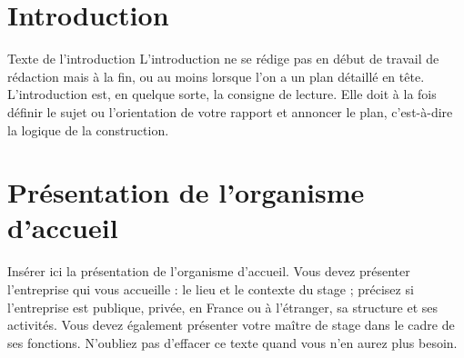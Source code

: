 \chapter*{Introduction}

Texte de l'introduction
L’introduction ne se rédige pas en début de travail de rédaction mais à la fin, ou au moins lorsque l’on a un plan détaillé en tête.
L’introduction est, en quelque sorte, la consigne de lecture. Elle doit à la fois définir le sujet ou l’orientation de votre rapport et annoncer le plan, c’est-à-dire la logique de la construction.


\chapter*{Présentation de l’organisme d’accueil}

Insérer ici la présentation de l’organisme d’accueil.
Vous devez présenter l’entreprise qui vous accueille : le lieu et le contexte du stage ; précisez si l’entreprise est publique, privée, en France ou à l’étranger, sa structure et ses activités. Vous devez également présenter votre maître de stage dans le cadre de ses fonctions.
N’oubliez pas d’effacer ce texte quand vous n’en aurez plus besoin.